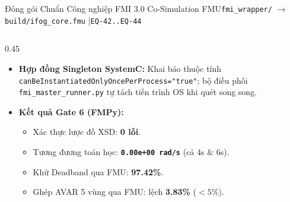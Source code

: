 \documentclass[aspectratio=169,8pt]{beamer}
\begin{document}
\begin{frame}{Đóng gói Chuẩn Công nghiệp FMI 3.0 Co-Simulation FMU}{\texttt{fmi\_wrapper/} $\to$ \texttt{build/ifog\_core.fmu} \enspace|\enspace \texttt{EQ-42..EQ-44}}
\begin{columns}[T]
\begin{column}{0.45\textwidth}
\begin{notebox}
\begin{itemize}
        \item \textbf{Hợp đồng Singleton SystemC:} Khai báo thuộc tính \texttt{canBeInstantiatedOnlyOncePerProcess="true"}; bộ điều phối \texttt{fmi\_master\_runner.py} tự tách tiến trình OS khi quét song song.
        \item \textbf{Kết quả Gate 6 (FMPy):}
          \begin{itemize}\setlength\itemsep{1.5pt}
            \item Xác thực lược đồ XSD: \textbf{0 lỗi}.
            \item Tương đương toán học: \textbf{\texttt{0.00e+00 rad/s}} (cả 4s \& 6s).
            \item Khử Deadband qua FMU: \textbf{97.42\%}.
            \item Ghép AVAR 5 vùng qua FMU: lệch \textbf{3.83\%} ($<5\%$).
          \end{itemize}
      \end{itemize}
    \end{notebox}
  \end{column}
\end{columns}
\end{frame}
\end{document}
